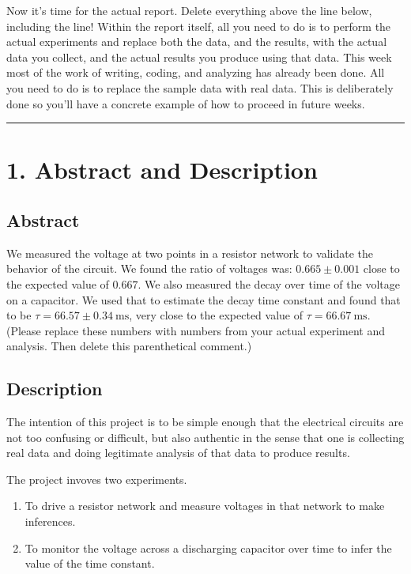 \documentclass[
  letterpaper,
  DIV=11,
  numbers=noendperiod]{scrartcl}
\providecommand{\tightlist}{%
  \setlength{\itemsep}{0pt}\setlength{\parskip}{0pt}}\usepackage{longtable,booktabs,array}
\begin{document}
Now it's time for the actual report. Delete everything above the line
below, including the line! Within the report itself, all you need to do
is to perform the actual experiments and replace both the data, and the
results, with the actual data you collect, and the actual results you
produce using that data. This week most of the work of writing, coding,
and analyzing has already been done. All you need to do is to replace
the sample data with real data. This is deliberately done so you'll have
a concrete example of how to proceed in future weeks.

\begin{center}\rule{0.5\linewidth}{0.5pt}\end{center}

\section{1. Abstract and Description}\label{abstract-and-description}

\subsection{Abstract}\label{abstract}

We measured the voltage at two points in a resistor network to validate
the behavior of the circuit. We found the ratio of voltages was:
\(0.665\pm 0.001\) close to the expected value of \(0.667\). We also
measured the decay over time of the voltage on a capacitor. We used that
to estimate the decay time constant and found that to be
\(\tau = 66.57 \pm 0.34\mathrm{~ms}\), very close to the expected value
of \(\tau =66.67\mathrm{~ms}\). (Please replace these numbers with
numbers from your actual experiment and analysis. Then delete this
parenthetical comment.)

\subsection{Description}\label{description}

The intention of this project is to be simple enough that the electrical
circuits are not too confusing or difficult, but also authentic in the
sense that one is collecting real data and doing legitimate analysis of
that data to produce results.

The project invoves two experiments.

\begin{enumerate}
\def\labelenumi{\arabic{enumi}.}
\tightlist
\item
  To drive a resistor network and measure voltages in that network to
  make inferences.
\item
  To monitor the voltage across a discharging capacitor over time to
  infer the value of the time constant.
\end{enumerate}
\end{document}

